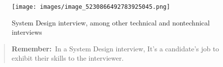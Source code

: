 \begin{figure}[htbp]
    \centering
    \texttt{[image: images/image\_5230866492783925045.png]}
    \caption{System Design interview, among other technical and nontechnical interviews}
\end{figure}

\begin{quote} \textbf{Remember:}~In a System Design interview, It's a candidate's job to exhibit their skills to the interviewer. \end{quote}

